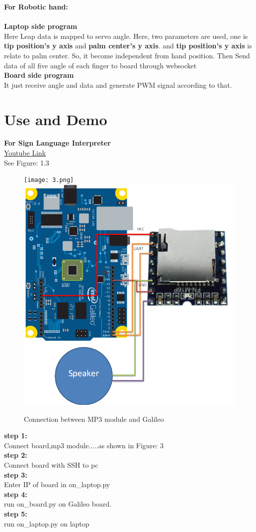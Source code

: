 \documentclass[a4paper,12pt,oneside]{book}
\begin{document}
\vspace{.3cm}
\textbf{For Robotic hand:}\\
\vspace{.3cm}\\
\textbf{Laptop side program}\\
Here Leap data is mapped to servo angle. Here, two parameters are used, one is \textbf{tip position's y axis} and \textbf{palm center's y axis}. and \textbf{tip position's y axis} is relate to palm center. So, it become independent from hand position. Then Send data of all five angle of each finger to board through websocket\\
\textbf{Board side program}\\
It just receive angle and data and generate PWM signal according to that.
\section{Use and Demo}
\textbf{For Sign Language Interpreter}\\
\href{https://youtu.be/sPYWe_E_F5w}{Youtube Link}\\
See Figure: 1.3\\
\begin{figure}
  \texttt{[image: 3.png]}
  \includegraphics[width=12cm]{5.png}
  \caption{Connection between MP3 module and Galileo}
\end{figure}
\textbf{step 1:}\\
Connect board,mp3 module.....as shown in Figure: 3\\
\textbf{step 2:}\\
Connect board with SSH to pc\\
\textbf{step 3:}\\
Enter IP of board in on\_laptop.py\\
\textbf{step 4:}\\
run on\_board.py on Galileo board.\\
\textbf{step 5:}\\
run on\_laptop.py on laptop\\
\end{document}
